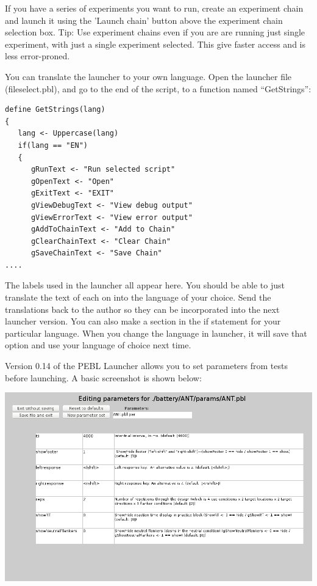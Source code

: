 If you have a series of experiments you want to run, create an experiment chain and launch it using the 'Launch chain' button above the experiment chain selection box.  Tip: Use experiment chains even if you are are running just single experiment, with just a single experiment selected.  This give faster access and is less error-proned.

You can translate the launcher to your own language.  Open the launcher file (fileselect.pbl), and go to the end of the script, to a function named ``GetStrings'':
\begin{verbatim}
define GetStrings(lang)
{
   lang <- Uppercase(lang)
   if(lang == "EN")
   {
      gRunText <- "Run selected script"
      gOpenText <- "Open"
      gExitText <- "EXIT"
      gViewDebugText <- "View debug output"
      gViewErrorText <- "View error output"
      gAddToChainText <- "Add to Chain"
      gClearChainText <- "Clear Chain"
      gSaveChainText <- "Save Chain"
....
\end{verbatim}

The labels used in the launcher all appear here.  You should be able to just translate the text of each on into the language of your choice.  Send the translations back to the author so they can be incorporated into the next launcher version.  You can also make a section in the if statement for your particular language.  When you change the language in launcher, it will save that option and use your language of choice next time.

Version 0.14 of the PEBL Launcher allows you to set parameters from tests before launching.  A basic screenshot is shown below:


 \includegraphics[scale=.3]{images/params.png} 
 
